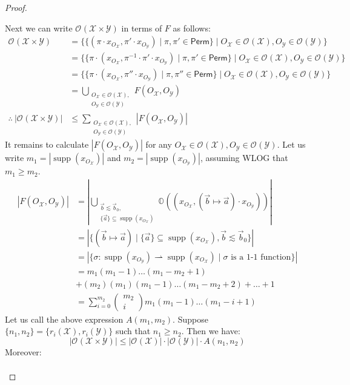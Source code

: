 \documentclass[10pt,a4paper]{article}
\theoremstyle{definition}
\theoremstyle{remark}
\newcommand\choice[2]{\left(\begin{matrix}{#1}\\{#2}\end{matrix}\right)}
\newcommand\regindex[0]{r_i}
\DeclareMathOperator{\supp}{supp}
\newcommand\Xcal{\mathcal{X}}
\newcommand\Ycal{\mathcal{Y}}
\newcommand\orb[1][]{\mathcal{O}_{#1}}
\newcommand\orbs[1][]{\mathbb{O}_{#1}}
\newcommand{\move}[2]{(#1\mapsto#2)}
\newcommand\Perm[0]{{\mathsf{Perm}}}
\begin{document}
\begin{proof}
\begin{enumerate}
	Next we can write $\orb(\Xcal \times \Ycal)$ in terms of $F$ as follows:
	\begin{align*}
		\orb(\Xcal\times \Ycal) &= \{\{(\pi \cdot x_{O_\Xcal},\pi'\cdot x_{O_\Ycal}) \mid \pi, \pi' \in \Perm\} \mid O_\Xcal \in \orb(\Xcal), O_\Ycal \in \orb(\Ycal)\}\\
		&= \{\{\pi\cdot (x_{O_\Xcal},\pi^{-1}\cdot \pi'\cdot x_{O_\Ycal}) \mid \pi, \pi' \in \Perm\} \mid O_\Xcal \in \orb(\Xcal), O_\Ycal \in \orb(\Ycal)\}\\
		&= \{\{\pi\cdot (x_{O_\Xcal},\pi''\cdot x_{O_\Ycal}) \mid \pi, \pi'' \in \Perm\} \mid O_\Xcal \in \orb(\Xcal), O_\Ycal \in \orb(\Ycal)\}\\
		&= \bigcup_{\substack{O_\Xcal \in \orb(\Xcal),\\ O_\Ycal \in \orb(\Ycal)}}F(O_\Xcal, O_\Ycal)\\
		\therefore\ |\orb(\Xcal \times \Ycal)| &\le \sum_{\substack{O_\Xcal \in \orb(\Xcal),\\ O_\Ycal \in \orb(\Ycal)}}|F(O_\Xcal, O_\Ycal)| 
	\end{align*}
	It remains to calculate $|F(O_\Xcal, O_\Ycal)|$ for any $O_\Xcal \in \orb(\Xcal), O_\Ycal \in \orb(\Ycal)$. 
	Let us write $m_1 = |\supp(x_{O_\Xcal})|$ and $m_2 = |\supp(x_{O_\Ycal})|$,  assuming WLOG that $m_1 \ge m_2$.
		\begin{align*}
		|F(O_\Xcal, O_\Ycal)| &= |\bigcup_{\substack{\vec b \lesssim \vec b_0,\\ \{\vec a\} \subseteq \supp(x_{O_\Xcal})}}\orbs((x_{O_\Xcal}, \move{\vec b}{\vec a}\cdot x_{O_\Ycal}))|\\
		&=
		|\{\move{\vec b}{\vec a} \mid \{\vec a\} \subseteq \supp(x_{O_\Xcal}), \vec b \lesssim \vec b_0\}|
		\\&= |\{\sigma: \supp(x_{O_\Ycal}) \rightharpoonup \supp(x_{O_\Xcal}) \mid \sigma\text{ is a 1-1 function}\}|
		\\ &= m_1(m_1 - 1)\dots(m_1 - m_2 + 1) 
		\\&+ (m_2)(m_1)(m_1 - 1)\dots(m_1 - m_2 + 2) + \dots + 1
		\\ &=\sum^{m_2}_{i = 0} \choice{m_2}{i} m_1(m_1 - 1)\dots(m_1 - i + 1)  
									\end{align*}
        Let us call the above expression $A(m_1,m_2)$.
        Suppose $\{n_1, n_2\} = \{\regindex(\Xcal), \regindex(\Ycal)\}$ such that $n_1 \ge n_2$.
        Then we have:
        \[
        |\orb(\Xcal \times \Ycal)| \le |\orb(\Xcal)|\cdot|\orb(\Ycal)|\cdot A(n_1,n_2)
      \]
      Moreover:
      \begin{align*}

\end{align*}
\end{enumerate}
\end{proof}
\end{document}
